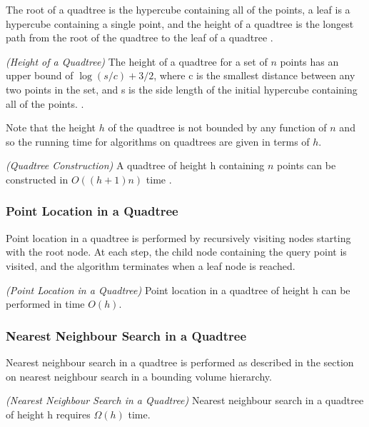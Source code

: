 \documentclass[mcs]{scsthesis}
\begin{document}
The root of a quadtree is the hypercube containing all of the points, a leaf
is a hypercube containing a single point, and the height of a quadtree
is the longest path from the root of the quadtree to the leaf of a quadtree
\cite{dutch}.

\begin{thm} \emph{(Height of a Quadtree)}
The height of a quadtree for a set of $n$ points has an upper bound of \(\log(s/c)
+ 3/2\), where c is the smallest distance between any two points in the set, and
s is the side length of the initial hypercube containing all of the points.
\cite{dutch}.
\end{thm}

Note that the height $h$ of the quadtree is not bounded by any function of $n$
and so the running time for algorithms on quadtrees are given in terms of $h$.

\begin{thm} \emph{(Quadtree Construction)}
A quadtree of height h containing $n$ points can be constructed in \(O((h + 1)n)\)
time \cite{dutch}.
\end{thm}

\subsubsection{Point Location in a Quadtree}

Point location in a quadtree is performed by recursively visiting nodes
starting with the root node. At each step, the child node containing the query
point is visited, and the algorithm terminates when a leaf node is reached.

\begin{thm} \emph{(Point Location in a Quadtree)} 
Point location in a quadtree of height h can be performed in time \(O(h)\). 
\end{thm}

\subsubsection{Nearest Neighbour Search in a Quadtree}

Nearest neighbour search in a quadtree is performed as described in the section
on nearest neighbour search in a bounding volume hierarchy.

\begin{thm} \emph{(Nearest Neighbour Search in a Quadtree)} 
Nearest neighbour search in a quadtree of height h requires \(\Omega(h)\) time.
\end{thm}
\end{document}

